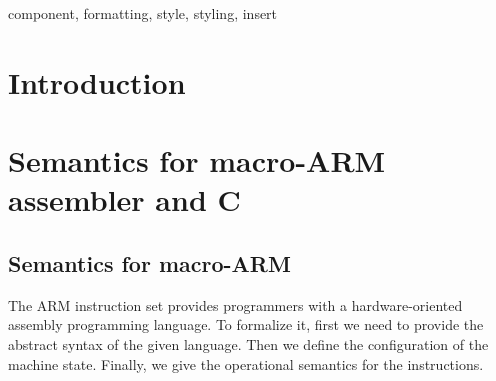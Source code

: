 \documentclass[conference]{IEEEtran}
\begin{document}
\begin{IEEEkeywords}
component, formatting, style, styling, insert
\end{IEEEkeywords}

\section{Introduction}
\section{Semantics for macro-ARM assembler and C}
\subsection{Semantics for macro-ARM}
The ARM instruction set provides programmers with a hardware-oriented assembly programming language. To formalize it, first we need to provide the abstract syntax of the given language. Then we define the configuration of the machine state. Finally, we give the operational semantics for the instructions.
%
\end{document}
